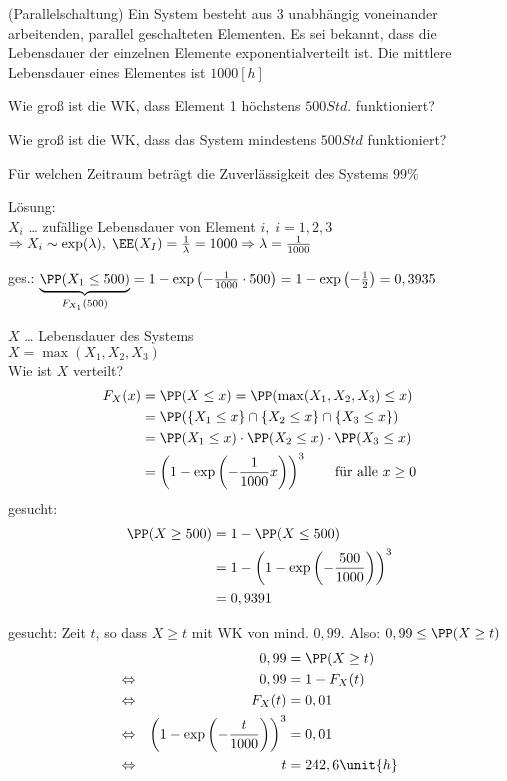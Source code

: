  (Parallelschaltung) Ein System besteht aus 3 unabhängig voneinander arbeitenden, parallel geschalteten Elementen. Es sei bekannt, dass die Lebensdauer der einzelnen Elemente exponentialverteilt ist. Die mittlere Lebensdauer eines Elementes ist $ 1000\unit{[h]} $
\begin{anumerate}
	\item Wie groß ist die WK, dass Element 1 höchstens $ 500\unit{Std.} $ funktioniert?
	\item Wie groß ist die WK, dass das System mindestens $ 500 \unit{Std} $ funktioniert?
	\item Für welchen Zeitraum beträgt die Zuverlässigkeit des Systems $ 99\% $
\end{anumerate}
Lösung:\\
$ X_i $ … zufällige Lebensdauer von Element $ i, \; i=1,2,3 $\\
$ \Rightarrow X_i \sim \exp(\lambda), \; \EE(X_I)=\frac{1}{\lambda}=1000 \Rightarrow \lambda=\frac{1}{1000} $
\begin{anumerate}
	\item ges.: $ \underbrace{\PP(X_1 \leq 500)}_{F_{X_1}(500)} = 1-\exp\left(-\frac{1}{1000}\cdot 500\right)=1-\exp\left(-\frac{1}{2}\right) = 0,3935 $
	\item $ X $ … Lebensdauer des Systems\\
	$ X=\max(X_1,X_2,X_3) $\\
	Wie ist $ X $ verteilt?
	\begin{align*}
	F_X(x)&=\PP(X\leq x)=\PP(\max(X_1,X_2,X_3)\leq x)\\
	&=\PP(\{X_1 \leq x\} \cap \{X_2 \leq x\} \cap \{X_3 \leq x\} )\\
	&=\PP(X_1 \leq x) \cdot \PP(X_2 \leq x) \cdot \PP(X_3 \leq x)\\
	&= \left(1-\exp\left(-\frac{1}{1000}x\right)\right)^3 \qquad \text{für alle }x\geq 0
	\end{align*}
	gesucht: 
	\begin{align*}
	\PP(X\geq 500) &= 1-\PP(X\leq 500)\\
	&=1-\left(1-\exp\left(-\frac{500}{1000}\right)\right)^3\\
	&=0,9391
	\end{align*}
	\item gesucht: Zeit $ t $, so dass $ X\geq t $ mit WK von mind. $ 0,99 $. Also: $ 0,99 \leq \PP(X\geq t) $
	\begin{align*}
	&&0,99 &= \PP(X\geq t)\\
	\Leftrightarrow&& 0,99 &= 1-F_X (t)\\
	\Leftrightarrow&& F_X(t) &= 0,01\\
	\Leftrightarrow&& \left(1-\exp\left(-\frac{t}{1000}\right)\right)^3 &=0,01\\
	\Leftrightarrow&& t &= 242,6 \unit{h}
	\end{align*}
\end{anumerate}

